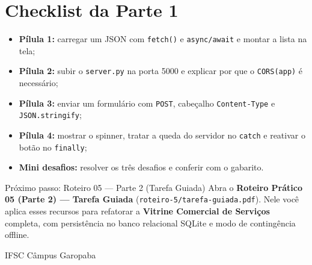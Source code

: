 \section{Checklist da Parte 1}\label{sec:checklist}

\begin{tcolorbox}[enhanced, colback=verdeVivo!5, colframe=verdeVivo!40, boxrule=0.6pt, arc=8pt,
    left=14pt, right=14pt, top=10pt, bottom=10pt,
    title={\faClipboardCheck\hspace{0.5em}Antes de seguir para a Parte 2, confira se você consegue\ldots},
    colbacktitle=verdeVivo, coltitle=white, fonttitle=\bfseries]
\begin{itemize}[label={\caixaMarcar}, itemsep=0.4em]
  \item \textbf{Pílula 1:} carregar um JSON com \texttt{fetch()} e \texttt{async/await} e montar a lista na tela;
  \item \textbf{Pílula 2:} subir o \texttt{server.py} na porta 5000 e explicar por que o \texttt{CORS(app)} é necessário;
  \item \textbf{Pílula 3:} enviar um formulário com \texttt{POST}, cabeçalho \texttt{Content-Type} e \texttt{JSON.stringify};
  \item \textbf{Pílula 4:} mostrar o spinner, tratar a queda do servidor no \texttt{catch} e reativar o botão no \texttt{finally};
  \item \textbf{Mini desafios:} resolver os três desafios e conferir com o gabarito.
\end{itemize}
\end{tcolorbox}

\begin{dica}{Próximo passo: Roteiro 05 — Parte 2 (Tarefa Guiada)}
Abra o \textbf{Roteiro Prático 05 (Parte 2) — Tarefa Guiada} (\texttt{roteiro-5/tarefa-guiada.pdf}). Nele você aplica esses recursos para refatorar a \textbf{Vitrine Comercial de Serviços} completa, com persistência no banco relacional SQLite e modo de contingência offline.
\end{dica}

\vfill
{\centering\footnotesize\color{suave}\faMapMarkerAlt\hspace{0.4em}IFSC Câmpus Garopaba\par}
